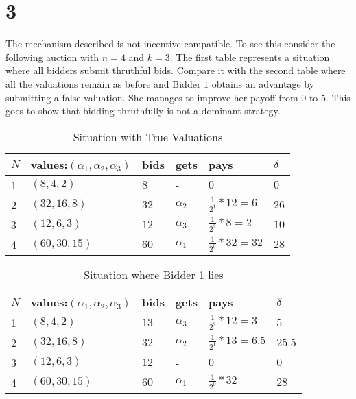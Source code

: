 \documentclass[10pt,a4paper]{article}
\begin{document}
\section*{3}
The mechanism described is not incentive-compatible. To see this consider the following auction with $n=4$ and $k=3$. The first table represents a situation where all bidders submit thruthful bids. Compare it with the second table where all the valuations remain as before and Bidder $1$ obtains an advantage by submitting a false valuation. She manages to improve her payoff from $0$ to $5$. This goes to show that bidding thruthfully is not a dominant strategy.
\begin{table}[]
\centering
\caption{Situation with True Valuations}
\label{my-label}
\begin{tabular}{|l|l|l|l|l|l|}
\hline
$N$ & values:$(\alpha_1,\alpha_2,\alpha_3)$ & bids & gets       & pays                & $\delta$ \\ \hline
1 & $(8,4,2)$                                & $8$    & -          & $0$                   & $0$        \\ \hline
2 & $(32,16,8)$                              & $32$   & $\alpha_2$ & $\tfrac{1}{2^1}*12=6$ & $26$       \\ \hline
3 & $(12,6,3)$                               & $12$   & $\alpha_3$ & $\tfrac{1}{2^2}*8=2$  & $10$       \\ \hline
4 & $(60,30,15)$                             & $60$   & $\alpha_1$ & $\tfrac{1}{2^0}*32=32$ & $28$       \\ \hline
\end{tabular}
\end{table}
\begin{table}[]
\centering
\caption{Situation where Bidder 1 lies}
\label{my-label}
\begin{tabular}{|l|l|l|l|l|l|}
\hline
$N$ & values:$(\alpha_1,\alpha_2,\alpha_3)$ & bids & gets       & pays                & $\delta$ \\ \hline
1 & $(8,4,2)$                                & $13$    & $\alpha_3$& $\tfrac{1}{2^2}*12=3$  & $5$     \\ \hline
2 & $(32,16,8)$                              & $32$   & $\alpha_2$ & $\tfrac{1}{2^1}*13=6.5$ & $25.5$       \\ \hline
3 & $(12,6,3)$                               & $12$   & -			 & $0$  					& $0$       \\ \hline
4 & $(60,30,15)$                             & $60$   & $\alpha_1$ & $\tfrac{1}{2^0}*32$ & $28$       \\ \hline
\end{tabular}
\end{table}
\end{document}
